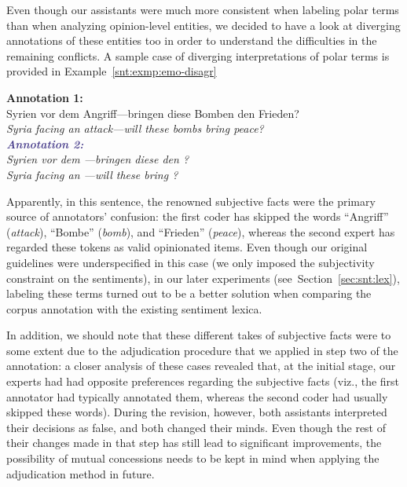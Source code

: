 Even though our assistants were much more consistent when labeling
polar terms than when analyzing opinion-level entities, we
decided to have a look at diverging annotations of these entities too
in order to understand the difficulties in the remaining conflicts.  A
sample case of diverging interpretations of polar terms is provided in
Example~\ref{snt:exmp:emo-disagr}

\begin{example}\label{snt:exmp:emo-disagr}
  \textcolor{red3}{\textbf{Annotation 1:}}\\ \upshape{}Syrien vor dem
  Angriff---bringen diese Bomben den Frieden?\\[0.3em]\itshape
  \noindent\itshape{}Syria facing an attack---will these bombs bring
  peace?\\

  \noindent\textcolor{darkslateblue}{\textbf{\itshape Annotation
      2:}}\\ \upshape{}Syrien vor dem
  \emoexpression{\textcolor{red}{Angriff}}---bringen diese
  \emoexpression{\textcolor{red}{Bomben}} den
  \emoexpression{\textcolor{red}{Frieden}}?\\[0.3em]
  \noindent\itshape{}Syria facing an
  \upshape{}\itshape{}---will
  these
  \upshape{}\itshape{}
  bring
  \upshape{}\itshape{}?
\end{example}

Apparently, in this sentence, the renowned subjective facts were the
primary source of annotators' confusion: the first coder has skipped
the words ``Angriff'' (\emph{attack}), ``Bombe'' (\emph{bomb}), and
``Frieden'' (\emph{peace}), whereas the second expert has regarded
these tokens as valid opinionated items.  Even though our original
guidelines were underspecified in this case (we only imposed the
subjectivity constraint on the sentiments), in our later experiments
(see~Section~\ref{sec:snt:lex}), labeling these terms turned out to be
a better solution when comparing the corpus annotation with the
existing sentiment lexica.

In addition, we should note that these different takes of subjective
facts were to some extent due to the adjudication procedure that we
applied in step two of the annotation: a closer analysis of these
cases revealed that, at the initial stage, our experts had had
opposite preferences regarding the subjective facts (viz., the first
annotator had typically annotated them, whereas the second coder had
usually skipped these words).  During the revision, however, both
assistants interpreted their decisions as false, and both changed
their minds.  Even though the rest of their changes made in that step
has still lead to significant improvements, the possibility of mutual
concessions needs to be kept in mind when applying the adjudication
method in future.

